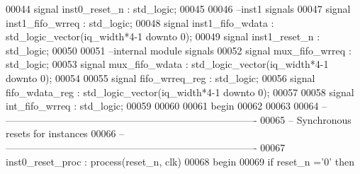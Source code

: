 \begin{DoxyCode}
00044 \textcolor{keywordflow}{signal} \textcolor{vhdlchar}{inst0_reset_n}        \textcolor{vhdlchar}{:} \textcolor{comment}{std\_logic};
00045 
00046 \textcolor{keyword}{--inst1 signals}
00047 \textcolor{keywordflow}{signal} \textcolor{vhdlchar}{inst1_fifo_wrreq} \textcolor{vhdlchar}{:} \textcolor{comment}{std\_logic};
00048 \textcolor{keywordflow}{signal} \textcolor{vhdlchar}{inst1_fifo_wdata} \textcolor{vhdlchar}{:} \textcolor{comment}{std\_logic\_vector}\textcolor{vhdlchar}{(}\textcolor{vhdlchar}{iq_width}\textcolor{vhdlchar}{*}\textcolor{vhdllogic}{4-1} \textcolor{keywordflow}{downto} \textcolor{vhdllogic}{}\textcolor{vhdllogic}{0}\textcolor{vhdlchar}{)};
00049 \textcolor{keywordflow}{signal} \textcolor{vhdlchar}{inst1_reset_n}        \textcolor{vhdlchar}{:} \textcolor{comment}{std\_logic};
00050 
00051 \textcolor{keyword}{--internal module signals}
00052 \textcolor{keywordflow}{signal} \textcolor{vhdlchar}{mux_fifo_wrreq}   \textcolor{vhdlchar}{:} \textcolor{comment}{std\_logic};
00053 \textcolor{keywordflow}{signal} \textcolor{vhdlchar}{mux_fifo_wdata}   \textcolor{vhdlchar}{:} \textcolor{comment}{std\_logic\_vector}\textcolor{vhdlchar}{(}\textcolor{vhdlchar}{iq_width}\textcolor{vhdlchar}{*}\textcolor{vhdllogic}{4-1} \textcolor{keywordflow}{downto} \textcolor{vhdllogic}{}\textcolor{vhdllogic}{0}\textcolor{vhdlchar}{)};
00054 
00055 \textcolor{keywordflow}{signal} \textcolor{vhdlchar}{fifo_wrreq_reg}   \textcolor{vhdlchar}{:} \textcolor{comment}{std\_logic};
00056 \textcolor{keywordflow}{signal} \textcolor{vhdlchar}{fifo_wdata_reg}   \textcolor{vhdlchar}{:} \textcolor{comment}{std\_logic\_vector}\textcolor{vhdlchar}{(}\textcolor{vhdlchar}{iq_width}\textcolor{vhdlchar}{*}\textcolor{vhdllogic}{4-1} \textcolor{keywordflow}{downto} \textcolor{vhdllogic}{}\textcolor{vhdllogic}{0}\textcolor{vhdlchar}{)};
00057 
00058 \textcolor{keywordflow}{signal} \textcolor{vhdlchar}{int_fifo_wrreq}   \textcolor{vhdlchar}{:} \textcolor{comment}{std\_logic};
00059 
00060 
00061 \textcolor{vhdlkeyword}{begin}
00062 
00063 
00064 \textcolor{keyword}{-- ----------------------------------------------------------------------------}
00065 \textcolor{keyword}{-- Synchronous resets for instances}
00066 \textcolor{keyword}{-- ----------------------------------------------------------------------------}
00067 inst0\_reset\_proc : \textcolor{keywordflow}{process}(reset_n, clk)
00068 \textcolor{vhdlkeyword}{begin}
00069    \textcolor{keywordflow}{if} \textcolor{vhdlchar}{reset_n} \textcolor{vhdlchar}{=}\textcolor{vhdlchar}{'}\textcolor{vhdllogic}{}\textcolor{vhdllogic}{0}\textcolor{vhdlchar}{'} \textcolor{keywordflow}{then} 

\end{DoxyCode}
